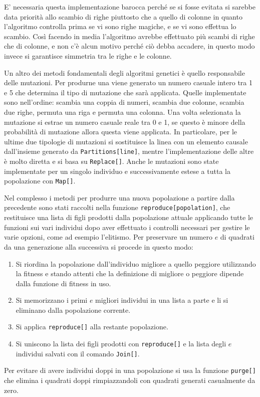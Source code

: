 \documentclass[italian,twoside,twocolumn]{article}
\begin{document}
E' necessaria questa implementazione barocca perché se si fosse evitata si sarebbe data priorità allo scambio di righe piuttosto che a quello di colonne in quanto l'algoritmo controlla prima se vi sono righe magiche, e se vi sono effettua lo scambio. Così facendo in media l'algoritmo avrebbe effettuato più scambi di righe che di colonne, e non c'è alcun motivo perché ciò debba accadere, in questo modo invece si garantisce simmetria tra le righe e le colonne. 

Un altro dei metodi fondamentali degli algoritmi genetici è quello responsabile delle mutazioni. Per produrne una viene generato un numero casuale intero tra 1 e 5 che determina il tipo di mutazione che sarà applicata. Quelle implementate sono nell'ordine: scambia una coppia di numeri, scambia due colonne, scambia due righe, permuta una riga e permuta una colonna. Una volta selezionata la mutazione si estrae un numero casuale reale tra 0 e 1, se questo è minore della probabilità di mutazione allora questa viene applicata. In particolare, per le ultime due tipologie di mutazioni si sostituisce la linea con un elemento causale dall'insieme generato da \texttt{Partitions[line]}, mentre l'implementazione delle altre è molto diretta e si basa su \texttt{Replace[]}. Anche le mutazioni sono state implementate per un singolo individuo e successivamente estese a tutta la popolazione con \texttt{Map[]}.

Nel complesso i metodi per produrre una nuova popolazione a partire dalla precedente sono stati raccolti nella funzione \texttt{reproduce[popolation]}, che restituisce una lista di figli prodotti dalla popolazione attuale applicando tutte le funzioni sui vari individui dopo aver effettuato i controlli necessari per gestire le varie opzioni, come ad esempio l'elitismo. Per preservare un numero $ e $ di quadrati da una generazione alla successiva si procede in questo modo:
\begin{enumerate}
	\item Si riordina la popolazione dall'individuo migliore a quello peggiore utilizzando la fitness e stando attenti che la definizione di migliore o peggiore dipende dalla funzione di fitness in uso.
	\item Si memorizzano i primi $ e $ migliori individui in una lista a parte e li si eliminano dalla popolazione corrente.
	\item Si applica \texttt{reproduce[]} alla restante popolazione.
	\item Si uniscono la lista dei figli prodotti con \texttt{reproduce[]} e la lista degli $ e $ individui salvati con il comando \texttt{Join[]}.
\end{enumerate}
Per evitare di avere individui doppi in una popolazione si usa la funzione \texttt{purge[]} che elimina i quadrati doppi rimpiazzandoli con quadrati generati casualmente da zero.
\end{document}
